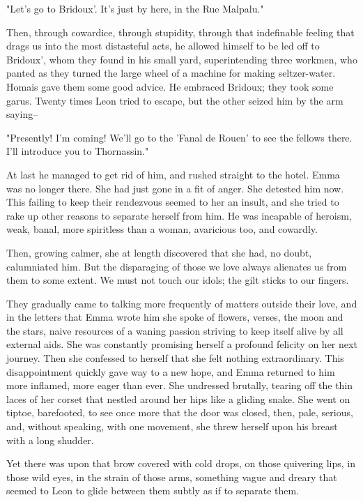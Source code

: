 \documentclass{tufte-book}
\begin{document}
"Let's go to Bridoux'. It's just by here, in the Rue Malpalu."

Then, through cowardice, through stupidity, through that indefinable
feeling that drags us into the most distasteful acts, he allowed
himself to be led off to Bridoux', whom they found in his small yard,
superintending three workmen, who panted as they turned the large
wheel of a machine for making seltzer-water. Homais gave them some good
advice. He embraced Bridoux; they took some garus. Twenty times Leon
tried to escape, but the other seized him by the arm saying--

"Presently! I'm coming! We'll go to the 'Fanal de Rouen' to see the
fellows there. I'll introduce you to Thornassin."

At last he managed to get rid of him, and rushed straight to the hotel.
Emma was no longer there. She had just gone in a fit of anger. She
detested him now. This failing to keep their rendezvous seemed to her an
insult, and she tried to rake up other reasons to separate herself from
him. He was incapable of heroism, weak, banal, more spiritless than a
woman, avaricious too, and cowardly.

Then, growing calmer, she at length discovered that she had, no doubt,
calumniated him. But the disparaging of those we love always alienates
us from them to some extent. We must not touch our idols; the gilt
sticks to our fingers.

They gradually came to talking more frequently of matters outside their
love, and in the letters that Emma wrote him she spoke of flowers,
verses, the moon and the stars, naive resources of a waning passion
striving to keep itself alive by all external aids. She was constantly
promising herself a profound felicity on her next journey. Then
she confessed to herself that she felt nothing extraordinary. This
disappointment quickly gave way to a new hope, and Emma returned to him
more inflamed, more eager than ever. She undressed brutally, tearing off
the thin laces of her corset that nestled around her hips like a gliding
snake. She went on tiptoe, barefooted, to see once more that the
door was closed, then, pale, serious, and, without speaking, with one
movement, she threw herself upon his breast with a long shudder.

Yet there was upon that brow covered with cold drops, on those quivering
lips, in those wild eyes, in the strain of those arms, something vague
and dreary that seemed to Leon to glide between them subtly as if to
separate them.
\end{document}
